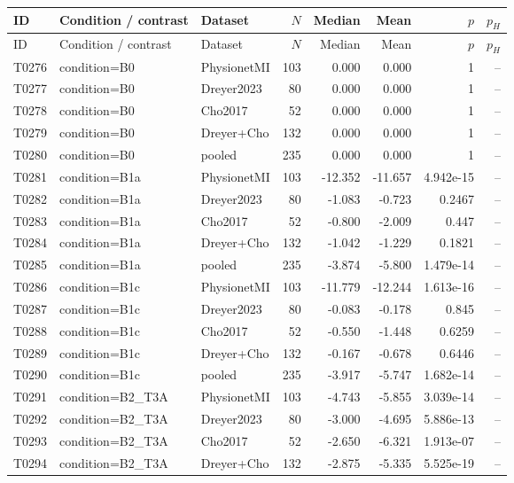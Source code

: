 \begin{longtable}{p{.45in}p{2.6in}p{.75in}rrrrr}
\toprule
ID & Condition / contrast & Dataset & $N$ & Median & Mean & $p$ & $p_H$ \\
\midrule
\endfirsthead
\toprule
ID & Condition / contrast & Dataset & $N$ & Median & Mean & $p$ & $p_H$ \\
\midrule
\endhead
T0276 & condition=B0 & PhysionetMI & 103 & 0.000 & 0.000 & 1 & -- \\
T0277 & condition=B0 & Dreyer2023 & 80 & 0.000 & 0.000 & 1 & -- \\
T0278 & condition=B0 & Cho2017 & 52 & 0.000 & 0.000 & 1 & -- \\
T0279 & condition=B0 & Dreyer+Cho & 132 & 0.000 & 0.000 & 1 & -- \\
T0280 & condition=B0 & pooled & 235 & 0.000 & 0.000 & 1 & -- \\
T0281 & condition=B1a & PhysionetMI & 103 & -12.352 & -11.657 & 4.942e-15 & -- \\
T0282 & condition=B1a & Dreyer2023 & 80 & -1.083 & -0.723 & 0.2467 & -- \\
T0283 & condition=B1a & Cho2017 & 52 & -0.800 & -2.009 & 0.447 & -- \\
T0284 & condition=B1a & Dreyer+Cho & 132 & -1.042 & -1.229 & 0.1821 & -- \\
T0285 & condition=B1a & pooled & 235 & -3.874 & -5.800 & 1.479e-14 & -- \\
T0286 & condition=B1c & PhysionetMI & 103 & -11.779 & -12.244 & 1.613e-16 & -- \\
T0287 & condition=B1c & Dreyer2023 & 80 & -0.083 & -0.178 & 0.845 & -- \\
T0288 & condition=B1c & Cho2017 & 52 & -0.550 & -1.448 & 0.6259 & -- \\
T0289 & condition=B1c & Dreyer+Cho & 132 & -0.167 & -0.678 & 0.6446 & -- \\
T0290 & condition=B1c & pooled & 235 & -3.917 & -5.747 & 1.682e-14 & -- \\
T0291 & condition=B2\_\allowbreak{}T3A & PhysionetMI & 103 & -4.743 & -5.855 & 3.039e-14 & -- \\
T0292 & condition=B2\_\allowbreak{}T3A & Dreyer2023 & 80 & -3.000 & -4.695 & 5.886e-13 & -- \\
T0293 & condition=B2\_\allowbreak{}T3A & Cho2017 & 52 & -2.650 & -6.321 & 1.913e-07 & -- \\
T0294 & condition=B2\_\allowbreak{}T3A & Dreyer+Cho & 132 & -2.875 & -5.335 & 5.525e-19 & -- \\

\end{longtable}
